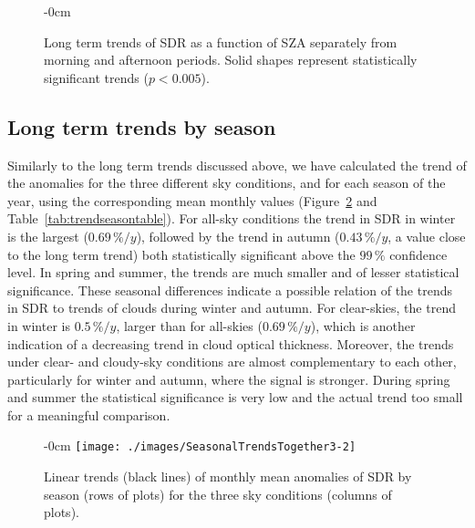 \documentclass[applsci,article,submit,moreauthors,pdftex]{Definitions/mdpi}
\begin{document}
\begin{figure}[h!]
    \begin{adjustwidth}{-\extralength}{0cm}
        {\centering 
            \hfill
            \hfill
        }
        \caption{Long term trends of SDR as a function of SZA separately from morning and afternoon periods. Solid shapes  represent statistically significant trends ($p < 0.005$).}\label{fig:szatrends}
    \end{adjustwidth}
\end{figure}

\hypertarget{long-term-trends-by-season}{%
\subsection{Long term trends by
season}\label{long-term-trends-by-season}}

Similarly to the long term trends discussed above, we have calculated
the trend of the anomalies for the three different sky conditions, and
for each season of the year, using the corresponding mean monthly values
(Figure~\ref{fig:seasonalALL} and Table~\ref{tab:trendseasontable}). For
all-sky conditions the trend in SDR in winter is the largest
(\(0.69\,\%/y\)), followed by the trend in autumn (\(0.43\,\%/y\), a
value close to the long term trend) both statistically significant above
the \(99\,\%\) confidence level. In spring and summer, the trends are
much smaller and of lesser statistical significance. These seasonal
differences indicate a possible relation of the trends in SDR to trends
of clouds during winter and autumn. For clear-skies, the trend in winter
is \(0.5\,\%/y\), larger than for all-skies (\(0.69\,\%/y\)), which is
another indication of a decreasing trend in cloud optical thickness.
Moreover, the trends under clear- and cloudy-sky conditions are almost
complementary to each other, particularly for winter and autumn, where
the signal is stronger. During spring and summer the statistical
significance is very low and the actual trend too small for a meaningful
comparison.

\begin{figure}[h!]
    \begin{adjustwidth}{-\extralength}{0cm}
        {\centering 
            \texttt{[image: ./images/SeasonalTrendsTogether3-2]} 
        }
        \caption{Linear trends (black lines) of monthly mean anomalies of SDR by season (rows of plots) for the three sky conditions (columns of plots).}\label{fig:seasonalALL}
    \end{adjustwidth}
\end{figure}
\end{document}

